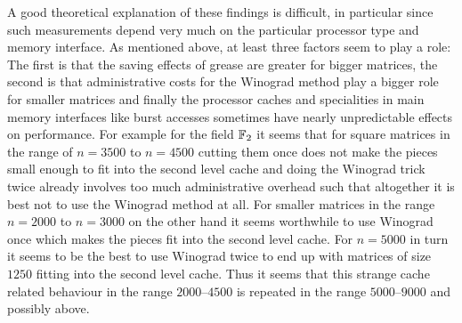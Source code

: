 A good theoretical explanation of these findings is difficult, in
particular since such measurements depend very much on the particular
processor type and memory interface. As mentioned above, at least
three factors
seem to play a role: The first is that the saving effects of grease
are greater for bigger matrices, the second is that administrative
costs for the Winograd method play a bigger role for smaller matrices
and finally the processor caches and specialities in main memory
interfaces like burst accesses sometimes have nearly unpredictable
effects on performance. For example for the field $\mathbb{F}_2$ it seems that
for square matrices in the range of $n=3500$ to $n=4500$ cutting them
once does not make the pieces small enough to fit into the second
level cache and doing the Winograd trick twice already involves
too much administrative overhead such that altogether it is best not
to use the Winograd method at all. For smaller matrices in the range $n=2000$
to $n=3000$ on the other hand it seems worthwhile to use Winograd once
which makes the pieces fit into the second level cache. For $n=5000$ in
turn it seems to be the best to use Winograd twice to end up with
matrices of size $1250$ fitting into the second level cache. Thus it
seems that this strange cache related behaviour in the range 
$2000$--$4500$ is repeated in the range $5000$--$9000$ and possibly
above.

